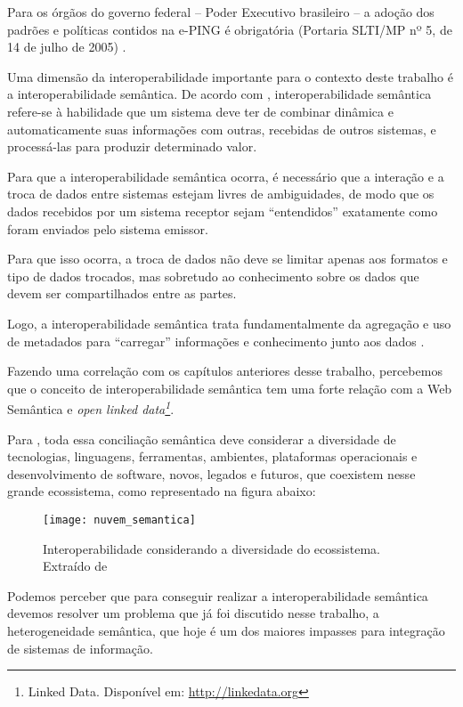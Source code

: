 Para os órgãos do governo federal – Poder Executivo brasileiro – a adoção dos padrões e políticas contidos na e-PING é obrigatória (Portaria SLTI/MP nº 5, de 14 de julho de 2005) \cite{eping}.

Uma dimensão da interoperabilidade importante para o contexto deste trabalho é a interoperabilidade semântica. De acordo com \cite{eif}, interoperabilidade semântica refere-se à habilidade que um sistema deve ter de combinar dinâmica e automaticamente suas informações com outras, recebidas de outros sistemas, e processá-las para produzir determinado valor.	

Para que a interoperabilidade semântica ocorra, é necessário que a interação e a troca de dados entre sistemas estejam livres de ambiguidades, de modo que os dados recebidos por um sistema receptor sejam “entendidos” exatamente como foram enviados pelo sistema emissor.

 Para que isso ocorra, a troca de dados não deve se limitar apenas aos formatos e tipo de dados trocados, mas sobretudo ao conhecimento sobre os dados que devem ser compartilhados entre as partes\cite{kamada}.

Logo, a interoperabilidade semântica trata fundamentalmente da agregação e uso de metadados para “carregar” informações e conhecimento junto aos dados \cite{kamada}.

Fazendo uma correlação com os capítulos anteriores desse trabalho, percebemos que o conceito de interoperabilidade semântica tem uma forte relação com a Web Semântica  e \emph{open linked data\footnote{Linked Data. Disponível em: \url{http://linkedata.org}}}. 

Para \cite{kamada}, toda essa conciliação semântica deve considerar a diversidade de tecnologias, linguagens, ferramentas, ambientes, plataformas operacionais e desenvolvimento de software, novos, legados e futuros, que coexistem nesse grande ecossistema, como representado na figura abaixo:

\graphicspath{{figuras/}}
\begin{figure}[H]
\centering
\texttt{[image: nuvem\_semantica]}
\caption[Interoperabilidade considerando a diversidade do ecossistema.]{Interoperabilidade considerando a diversidade do ecossistema. Extraído de \cite{kamada} }
\label{nuvem_semantica}
\end{figure}
Podemos perceber que para conseguir realizar a interoperabilidade semântica devemos resolver um problema que já foi discutido nesse trabalho, a heterogeneidade semântica, que hoje é um dos maiores impasses para integração de sistemas de informação.

